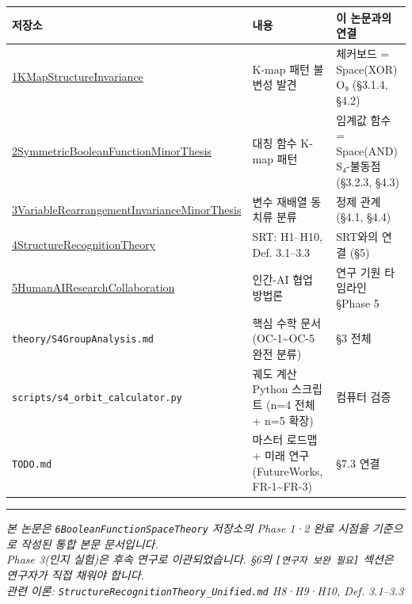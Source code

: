 \documentclass[
]{article}
\newcounter{none} %
\begin{document}
{\def\LTcaptype{none} %
\begin{longtable}[]{@{}
  >{\raggedright\arraybackslash}p{}
  >{\raggedright\arraybackslash}p{}
  >{\raggedright\arraybackslash}p{}@{}}
\toprule\noalign{}
\begin{minipage}[b]{\linewidth}\raggedright
저장소
\end{minipage} & \begin{minipage}[b]{\linewidth}\raggedright
내용
\end{minipage} & \begin{minipage}[b]{\linewidth}\raggedright
이 논문과의 연결
\end{minipage} \\
\midrule\noalign{}
\endhead
\bottomrule\noalign{}
\endlastfoot
\href{https://inha20.github.io/1KMapStructureInvariance/}{1KMapStructureInvariance}
& K-map 패턴 불변성 발견 & 체커보드 = Space(XOR) O₉ (§3.1.4, §4.2) \\
\href{https://inha20.github.io/2SymmetricBooleanFunctionMinorThesis/}{2SymmetricBooleanFunctionMinorThesis}
& 대칭 함수 K-map 패턴 & 임계값 함수 = Space(AND) S₄-불동점 (§3.2.3,
§4.3) \\
\href{https://inha20.github.io/3VariableRearrangementInvarianceMinorThesis/}{3VariableRearrangementInvarianceMinorThesis}
& 변수 재배열 동치류 분류 & 정제 관계 (§4.1, §4.4) \\
\href{https://inha20.github.io/4StructureRecognitionTheory/}{4StructureRecognitionTheory}
& SRT: H1--H10, Def. 3.1--3.3 & SRT와의 연결 (§5) \\
\href{https://inha20.github.io/5HumanAIResearchCollaboration/}{5HumanAIResearchCollaboration}
& 인간-AI 협업 방법론 & 연구 기원 타임라인 §Phase 5 \\
\texttt{theory/S4GroupAnalysis.md} & 핵심 수학 문서
(OC-1\textasciitilde OC-5 완전 분류) & §3 전체 \\
\texttt{scripts/s4\_orbit\_calculator.py} & 궤도 계산 Python 스크립트
(n=4 전체 + n=5 확장) & 컴퓨터 검증 \\
\texttt{TODO.md} & 마스터 로드맵 + 미래 연구(FutureWorks,
FR-1\textasciitilde FR-3) & §7.3 연결 \\
\end{longtable}
}

\begin{center}\rule{0.5\linewidth}{0.5pt}\end{center}

\emph{본 논문은 \texttt{6BooleanFunctionSpaceTheory} 저장소의 Phase 1·2
완료 시점을 기준으로 작성된 통합 본문 문서입니다.}\\
\emph{Phase 3(인지 실험)은 후속 연구로 이관되었습니다. §6의
\texttt{{[}연구자\ 보완\ 필요{]}} 섹션은 연구자가 직접 채워야 합니다.}\\
\emph{관련 이론: \texttt{StructureRecognitionTheory\_Unified.md}
H8·H9·H10, Def. 3.1--3.3}
\end{document}
